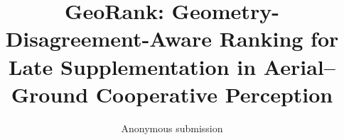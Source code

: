 \documentclass[10pt,twocolumn,letterpaper]{article}
\title{GeoRank: Geometry-Disagreement-Aware Ranking for Late Supplementation in Aerial--Ground Cooperative Perception}
\author{Anonymous submission}
\begin{document}
\maketitle


\FloatBarrier
{\small}
\clearpage

\FloatBarrier
\end{document}
